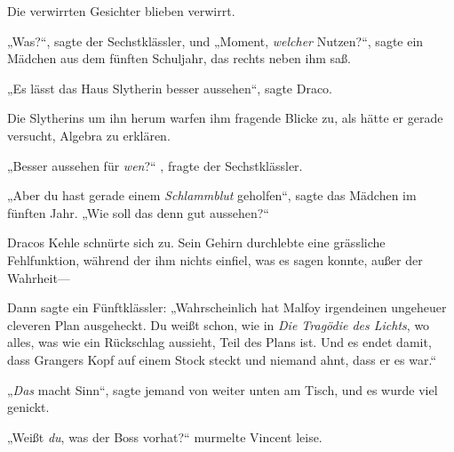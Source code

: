 Die verwirrten Gesichter blieben verwirrt.

„Was?“, sagte der Sechstklässler, und „Moment, \emph{welcher} Nutzen?“, sagte ein Mädchen aus dem fünften Schuljahr, das rechts neben ihm saß.

„Es lässt das Haus Slytherin besser aussehen“, sagte Draco.

Die Slytherins um ihn herum warfen ihm fragende Blicke zu, als hätte er gerade versucht, Algebra zu erklären.

„Besser aussehen für \emph{wen}?“ , fragte der Sechstklässler.

„Aber du hast gerade einem \emph{Schlammblut} geholfen“, sagte das Mädchen im fünften Jahr. „Wie soll das denn gut aussehen?“

Dracos Kehle schnürte sich zu. Sein Gehirn durchlebte eine grässliche Fehlfunktion, während der ihm nichts einfiel, was es sagen konnte, außer der Wahrheit—

Dann sagte ein Fünftklässler: „Wahrscheinlich hat Malfoy irgendeinen ungeheuer cleveren Plan ausgeheckt. Du weißt schon, wie in \emph{Die Tragödie des Lichts}, wo alles, was wie ein Rückschlag aussieht, Teil des Plans ist. Und es endet damit, dass Grangers Kopf auf einem Stock steckt und niemand ahnt, dass er es war.“

„\emph{Das} macht Sinn“, sagte jemand von weiter unten am Tisch, und es wurde viel genickt.

\later

„Weißt \emph{du}, was der Boss vorhat?“ murmelte Vincent leise.

